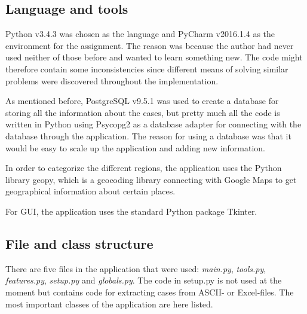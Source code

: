 \documentclass[12pt]{article}
\begin{document}
\subsection{Language and tools}
\label{sec:language}

Python v3.4.3 was chosen as the language and PyCharm v2016.1.4 as the environment for the assignment. The reason was because the author had never used neither of those before and wanted to learn something new. The code might therefore contain some inconsistencies since different means of solving similar problems were discovered throughout the implementation. 

As mentioned before, PostgreSQL v9.5.1 was used to create a database for storing all the information about the cases, but pretty much all the code is written in Python using Psycopg2 as a database adapter for connecting with the database through the application. The reason for using a database was that it would be easy to scale up the application and adding new information.

In order to categorize the different regions, the application uses the Python library geopy, which is a geocoding library connecting with Google Maps to get geographical information about certain places. 

For GUI, the application uses the standard Python package Tkinter. 

\subsection{File and class structure}
\label{sec:files}

There are five files in the application that were used: \textit{main.py}, \textit{tools.py}, \textit{features.py}, \textit{setup.py} and \textit{globals.py}. The code in setup.py is not used at the moment but contains code for extracting cases from ASCII- or Excel-files. The most important classes of the application are here listed.
\end{document}
